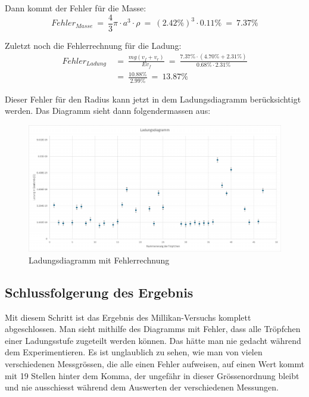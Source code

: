 \noindent Dann kommt der Fehler für die Masse:
\begin{equation*}\label{eq:fehlerMasse}
	Fehler_{Masse} \ = \ \frac{4}{3} \pi \cdot a^3 \cdot \rho \ = \ (2.42\%)^3 \cdot 0.11\% \ = \ 7.37\%
\end{equation*}

\noindent Zuletzt noch die Fehlerrechnung für die Ladung:
\begin{equation*}
	\begin{split}
		Fehler_{Ladung} & \ = \ \frac{mg(v_f + v_r)}{Ev_f} \ = \ \frac{7.37\% \cdot (4.70\% + 2.31\%)}{0.68\% \cdot 2.31\%} \\
		& \ = \ \frac{10.88\%}{2.99\%} \ = \ 13.87\%	
	\end{split}
\end{equation*}

\noindent Dieser Fehler für den Radius kann jetzt in dem Ladungsdiagramm berücksichtigt werden. Das Diagramm sieht dann folgendermassen aus:

\begin{figure}[h]
	\centering
	\includegraphics[width=\textwidth]{bilder/pdf/LadungsdiagrammMit.pdf}
	\caption{Ladungsdiagramm mit Fehlerrechnung}
	\label{fig:ladungsdiagrammMFehlerrechnung}
\end{figure}

\subsection{Schlussfolgerung des Ergebnis}\label{sub:schlussfolgerung}
Mit diesem Schritt ist das Ergebnis des Millikan-Versuchs komplett abgeschlossen. Man sieht mithilfe des Diagramms mit Fehler, dass alle Tröpfchen einer Ladungsstufe zugeteilt werden können. Das hätte man nie gedacht während dem Experimentieren. Es ist unglaublich zu sehen, wie man von vielen verschiedenen Messgrössen, die alle einen Fehler aufweisen, auf einen Wert kommt mit 19 Stellen hinter dem Komma, der ungefähr in dieser Grössenordnung bleibt und nie ausschiesst während dem Auswerten der verschiedenen Messungen.




